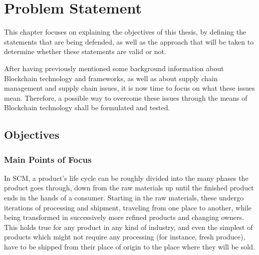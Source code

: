 \chapter{Problem Statement}
\label{chap:supply-chain-problems}
\minitoc \mtcskip \noindent 

This chapter focuses on explaining the objectives of this thesis, by defining the statements that are being defended, as well as the approach that will be taken to determine whether these statements are valid or not.


After having previously mentioned some background information about Blockchain technology and frameworks, as well as about supply chain management and supply chain issues, it is now time to focus on what these issues mean. Therefore, a possible way to overcome these issues through the means of Blockchain technology shall be formulated and tested.

\section{Objectives}


\subsection{Main Points of Focus}
\label{sec:points-of-focus}
In SCM, a product's life cycle can be roughly divided into the many phases the product goes through, down from the raw materials up until the finished product ends in the hands of a consumer. Starting in the raw materials, these undergo iterations of processing and shipment, traveling from one place to another, while being transformed in successively more refined products  and changing owners. This holds true for any product in any kind of industry, and even the simplest of products which might not require any processing (for instance, fresh produce), have to be shipped from their place of origin to the place where they will be sold.



